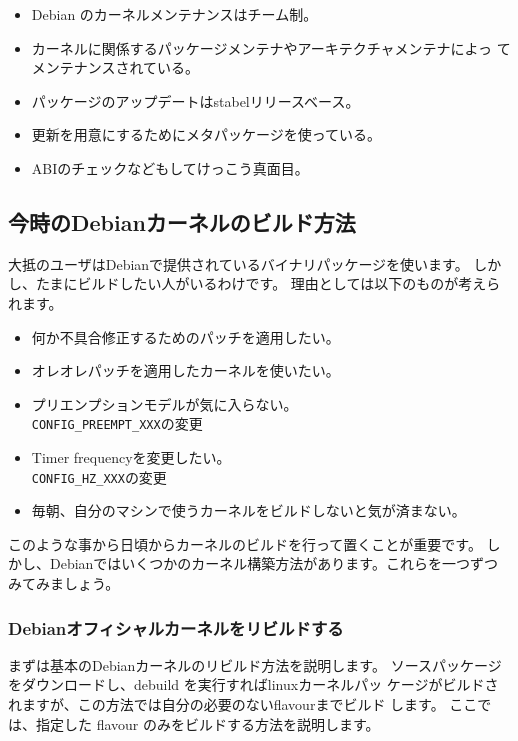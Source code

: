 \documentclass[mingoth,a4paper]{jsarticle}
\begin{document}
\begin{itemize}
\item Debian のカーネルメンテナンスはチーム制。
\item カーネルに関係するパッケージメンテナやアーキテクチャメンテナによっ
      てメンテナンスされている。
\item パッケージのアップデートはstabelリリースベース。
\item 更新を用意にするためにメタパッケージを使っている。
\item ABIのチェックなどもしてけっこう真面目。
\end{itemize}

\subsection{今時のDebianカーネルのビルド方法}

大抵のユーザはDebianで提供されているバイナリパッケージを使います。
しかし、たまにビルドしたい人がいるわけです。
理由としては以下のものが考えられます。

\begin{itemize}
\item 何か不具合修正するためのパッチを適用したい。
\item オレオレパッチを適用したカーネルを使いたい。
\item プリエンプションモデルが気に入らない。\\
\texttt{CONFIG\_PREEMPT\_XXX}の変更
\item Timer frequencyを変更したい。\\
\texttt{CONFIG\_HZ\_XXX}の変更
\item 毎朝、自分のマシンで使うカーネルをビルドしないと気が済まない。
\end{itemize}

このような事から日頃からカーネルのビルドを行って置くことが重要です。
しかし、Debianではいくつかのカーネル構築方法があります。これらを一つずつ
みてみましょう。

\subsubsection{Debianオフィシャルカーネルをリビルドする}

まずは基本のDebianカーネルのリビルド方法を説明します。
ソースパッケージをダウンロードし、debuild を実行すればlinuxカーネルパッ
ケージがビルドされますが、この方法では自分の必要のないflavourまでビルド
します。
ここでは、指定した flavour のみをビルドする方法を説明します。
\end{document}
